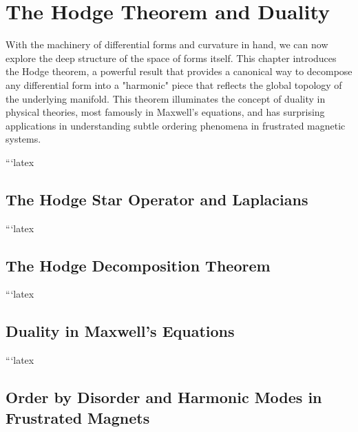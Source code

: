 \chapter{The Hodge Theorem and Duality}
\label{chap:hodge_duality}

With the machinery of differential forms and curvature in hand, we can now explore the deep structure of the space of forms itself. This chapter introduces the Hodge theorem, a powerful result that provides a canonical way to decompose any differential form into a "harmonic" piece that reflects the global topology of the underlying manifold. This theorem illuminates the concept of duality in physical theories, most famously in Maxwell's equations, and has surprising applications in understanding subtle ordering phenomena in frustrated magnetic systems.





```latex
\section{The Hodge Star Operator and Laplacians}
\label{sec:hodge_star_laplacians}

```latex
\section{The Hodge Decomposition Theorem}
\label{sec:hodge_decomposition}

```latex
\section{Duality in Maxwell's Equations}
\label{sec:duality_maxwell}

```latex
\section{Order by Disorder and Harmonic Modes in Frustrated Magnets}
\label{sec:order_by_disorder}

